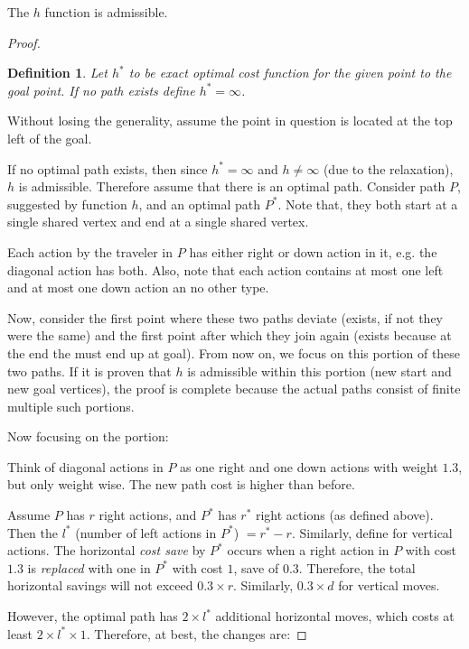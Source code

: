 \documentclass[11pt]{article}
\newtheorem*{definition}{Definition}
\begin{document}
				The $h$ function is admissible.
				\begin{proof}
					\begin{definition}
						Let $h^*$ to be exact optimal cost function for the given point to the goal point. If no path exists define $h^*= \infty$.
					\end{definition}
					
					Without losing the generality, assume the point in question is located at the top left of the goal.
					
					If no optimal path exists, then since $h^* = \infty$ and $h \ne \infty$ (due to the relaxation), $h$ is admissible. Therefore assume that there is an optimal path. Consider path $P$, suggested by function $h$, and an optimal path $P^*$. Note that, they both start at a single shared vertex and end at a single shared vertex.
					
					Each action by the traveler in $P$ has either right or down action in it, e.g. the diagonal action has both. Also, note that each action contains at most one left and at most one down action an no other type.
					
					Now, consider the first point where these two paths deviate (exists, if not they were the same) and the first point after which they join again (exists because at the end the must end up at goal). From now on, we focus on this portion of these two paths. If it is proven that $h$ is admissible within this portion (new start and new goal vertices), the proof is complete because the actual paths consist of finite multiple such portions.
					
					Now focusing on the portion:
				
					Think of diagonal actions in $P$ as one right and one down actions with weight $1.3$, but only weight wise. The new path cost is higher than before.
					
					Assume $P$ has $r$ right actions, and $P^*$ has $r^*$ right actions (as defined above).  Then the $l^*$ (number of left actions in $P^*$) $= r^* - r$. Similarly, define for vertical actions. The horizontal \emph{cost save} by $P^*$ occurs when a right action in $P$ with cost $1.3$ is \emph{replaced} with one in $P^*$ with cost $1$, save of $0.3$. Therefore, the total horizontal savings will not exceed $0.3 \times r$. Similarly, $0.3 \times d$ for vertical moves.
					
					However, the optimal path has $2 \times l^*$ additional horizontal moves, which costs at least $2 \times l^* \times 1$. Therefore, at best, the changes are:
					

\end{proof}
\end{document}

